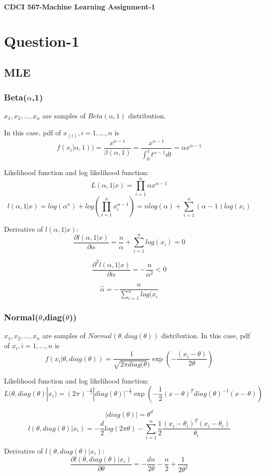 \documentclass[11pt]{article}
\begin{document}
	\begin{center}
		\Large\textbf{CDCI 567-Machine Learning Assignment-1}
	\end{center}
	\section{Question-1}
	\subsection{MLE}
	\subsubsection{Beta($\alpha$,1)}
	$x_{1},x_{2},...,x_{n}$ are samples of $Beta(\alpha,1)$ distribution.
	
	In this case, pdf of $x_(i), i=1,...,n$ is $$f(x_{i}|\alpha,1))=\frac{x^{\alpha-1}}{\beta(\alpha,1)}=
	\frac{x^{\alpha-1}}{\int_{0}^{1}t^{\alpha-1}dt}=
	\alpha x^{\alpha-1}$$
	
	Likelihood function and log likelihood function:
	$$L(\alpha,1|x)=\prod_{i=1}^{n}\alpha x^{\alpha-1}$$
	$$l(\alpha,1|x)=log(\alpha^{n}) + log(\prod_{i=1}^{n}x_{i}^{\alpha-1})=
	nlog(\alpha) + \sum_{i=1}^{n}(\alpha-1)log(x_{i})$$
	
	Derivative of $l(\alpha,1|x)$:
	$$\frac{\partial l(\alpha,1|x)}{\partial \alpha} = \frac{n}{\alpha} + \sum_{i=1}^{n}log(x_{i})=0$$
	
	$$\frac{\partial^{2} l(\alpha,1|x)}{\partial \alpha} = -\frac{n}{\alpha^{2}} < 0$$
	
	$$\hat{\alpha} = -\frac{n}{\sum_{i=1}^{n}log(x_{i}}$$
	\subsubsection{Normal($\theta$,diag($\theta$))}
	$x_{1},x_{2},...,x_{n}$ are samples of $Normal(\theta,diag(\theta))$ distribution.
	In this case, pdf of $x_{i}, i = 1,...,n$ is
	$$f(x_{i}|\theta,diag(\theta)) = \frac{1}{\sqrt{2\pi diag(\theta})}\exp(-\frac{(x_{i}-\theta)}{2\theta})$$
	
	Likelihood function and log likelihood function:
	$$L(\theta,diag(\theta)|x_{i}) = (2\pi)^{-\frac{d}{2}}|diag(\theta)|^{-\frac{1}{2}}\exp(-\frac{1}{2}(x-\theta)^{T}diag(\theta)^{-1}(x-\theta))$$	
	
	$$|diag(\theta)| = \theta^{d}$$
	$$l(\theta,diag(\theta)|x_{i}) = -\frac{d}{2}log(2\pi\theta) - \sum_{i=1}^{n}\frac{1}{2} \frac{(x_{i}-\theta_{i})^{T}(x_{i}-\theta_{i})}{\theta_{i}}$$
	
	Derivative of $l(\theta,diag(\theta)|x_{i})$:
	$$\frac{\partial l(\theta,diag(\theta)|x_{i})}{\partial \theta} = -\frac{dn}{2\theta} - \frac{n}{2} + \frac{1}{2\theta^{2}}$$
\end{document}
